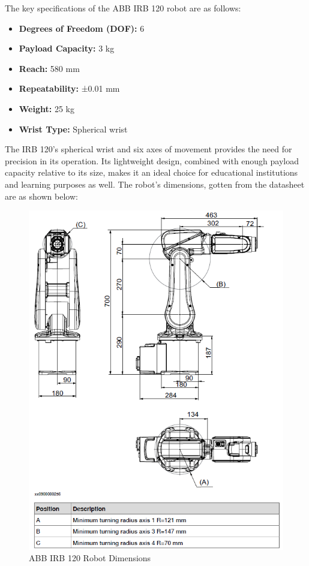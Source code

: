 \noindent The key specifications of the ABB IRB 120 robot are as follows:
\begin{itemize}
  \item \textbf{Degrees of Freedom (DOF):} 6
  \item \textbf{Payload Capacity:} 3 kg
  \item \textbf{Reach:} 580 mm
  \item \textbf{Repeatability:} ±0.01 mm
  \item \textbf{Weight:} 25 kg
  \item \textbf{Wrist Type:} Spherical wrist
\end{itemize}

\noindent The IRB 120's spherical wrist and six axes of movement provides the need for precision in its operation. Its lightweight design, combined with enough payload capacity relative to its size, makes it an ideal choice for educational institutions and learning purposes as well. The robot's dimensions, gotten from the datasheet are as shown below:

\begin{figure}[H]
  \centering
  \includegraphics[width=4.8in ]{pics/dimensions_abb.png}
  \caption{ABB IRB 120 Robot Dimensions}\label{dimensions_abb}
\end{figure}


